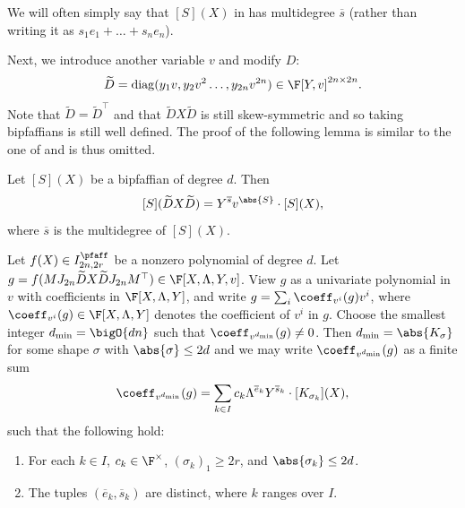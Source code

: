 \documentclass[letterpaper, 11pt]{amsart}
\begin{document}
We will often simply say that $[S](X)$ in  has multidegree $\overline{s}$ (rather than writing it as $s_1 e_1 + \dots + s_n e_n$).

Next, we introduce another variable $v$ and modify $D$:
\[
    \widetilde{D} = \mathrm{diag}(y_1 v, y_2 v^2\dots,y_{2n} v^{2n} ) \in \F[Y,v]^{2n\times 2n}.
\]
Note that $\widetilde{D} = \widetilde{D}^\top$ and that $\widetilde{D} X \widetilde{D}$ is still skew-symmetric and so taking bipfaffians is still well defined.
The proof of the following lemma is similar to the one of  and is thus omitted.
\begin{lem}\label{lem:multiply-by-diag_pfaff}
Let $[S](X)$ be a bipfaffian of degree $d$.
Then 
\[
    [S](\widetilde{D} X \widetilde{D}) = Y^{\overline{s}}v^{\abs{S}} \cdot [S](X),
\]
where $\overline{s}$ is the multidegree of $[S](X)$.
\end{lem}

\begin{lem}\label{lem:key_pfaff}
Let $f(X) \in I^{\pfaff}_{2n, 2r}$ be a nonzero polynomial of degree $d$.
Let $g = f(M J_{2n} \widetilde{D} X \widetilde{D} J_{2n} M^\top) \in \F[X, \Lambda, Y, v]$.
View $g$ as a univariate polynomial in $v$ with coefficients in $\F[X, \Lambda, Y]$, and write $g=\sum_{i} \coeff_{v^i}(g) v^i$, where $\coeff_{v^i}(g)\in \F[X, \Lambda ,Y]$ denotes the coefficient of $v^i$ in $g$.
Choose the smallest integer $d_{\min} = \bigO{dn}$ such that  $\coeff_{v^{d_{\min}}}(g)\neq 0$.
Then $d_{\min} = \abs{K_\sigma}$ for some shape $\sigma$ with $\abs{\sigma}\leq 2d$ and we may write $\coeff_{v^{d_{\min}}}(g)$ as a finite sum
\[
    \coeff_{v^{d_{\min}}}(g) = \sum_{k\in I} c_k \Lambda^{\overline{e}_k} Y^{\overline{s}_k} \cdot [K_{\sigma_k}](X), 
\]
such that the following hold:
\begin{enumerate}
    \item\label{item:required1_pfaff} For each $k\in I$, $c_k\in\F^\times$,  $(\sigma_k)_1\geq 2r$, and $\abs{\sigma_k} \leq 2d$.
    \item\label{item:required2_pfaff} The tuples $(\overline{e}_k, \overline{s}_k)$ are distinct, where $k$ ranges over $I$.
\end{enumerate}
\end{lem}
\end{document}

